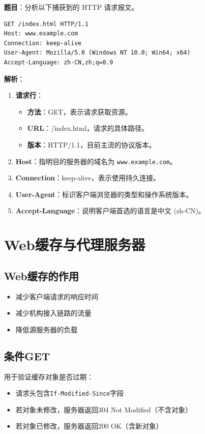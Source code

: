 \begin{examplebox}
\textbf{题目}：分析以下捕获到的 HTTP 请求报文。
\begin{lstlisting}[basicstyle=\ttfamily\footnotesize]
GET /index.html HTTP/1.1
Host: www.example.com
Connection: keep-alive
User-Agent: Mozilla/5.0 (Windows NT 10.0; Win64; x64)
Accept-Language: zh-CN,zh;q=0.9
\end{lstlisting}
\tcblower
\textbf{解析}：
\begin{enumerate}[itemsep=0pt]
    \item \textbf{请求行}：
    \begin{itemize}[itemsep=0pt]
        \item \textbf{方法}：GET，表示请求获取资源。
        \item \textbf{URL}：/index.html，请求的具体路径。
        \item \textbf{版本}：HTTP/1.1，目前主流的协议版本。
    \end{itemize}
    \item \textbf{Host}：指明目的服务器的域名为 \texttt{www.example.com}。
    \item \textbf{Connection}：keep-alive，表示使用持久连接。
    \item \textbf{User-Agent}：标识客户端浏览器的类型和操作系统版本。
    \item \textbf{Accept-Language}：说明客户端首选的语言是中文 (zh-CN)。
\end{enumerate}
\end{examplebox}

\section{Web缓存与代理服务器}
\subsection{Web缓存的作用}
\begin{itemize}[leftmargin=2em,itemsep=0pt]
    \item 减少客户端请求的响应时间
    \item 减少机构接入链路的流量
    \item 降低源服务器的负载
\end{itemize}

\subsection{条件GET}
用于验证缓存对象是否过期：
\begin{itemize}[leftmargin=2em,itemsep=0pt]
    \item 请求头包含\texttt{If-Modified-Since}字段
    \item 若对象未修改，服务器返回304 Not Modified（不含对象）
    \item 若对象已修改，服务器返回200 OK（含新对象）
\end{itemize}

